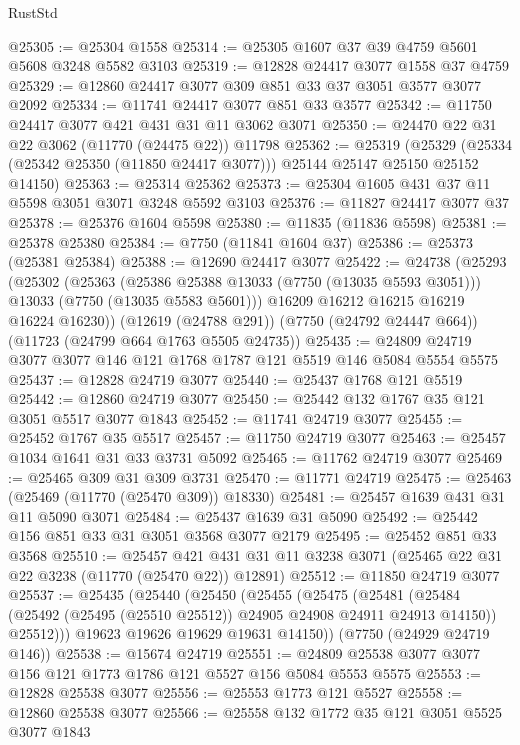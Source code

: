 \begin{lexlean}{RustStd}
\begin{coremodule}
@25305 := @25304 @1558
@25314 := @25305 @1607 @37 @39 @4759 @5601 @5608 @3248 @5582 @3103
@25319 := @12828 @24417 @3077 @1558 @37 @4759
@25329 := @12860 @24417 @3077 @309 @851 @33 @37 @3051 @3577 @3077 @2092
@25334 := @11741 @24417 @3077 @851 @33 @3577
@25342 := @11750 @24417 @3077 @421 @431 @31 @11 @3062 @3071
@25350 := @24470 @22 @31 @22 @3062 (@11770 (@24475 @22)) @11798
@25362 := @25319
    (@25329 (@25334 (@25342 @25350 (@11850 @24417 @3077))) @25144 @25147 @25150 @25152 @14150)
@25363 := @25314 @25362
@25373 := @25304 @1605 @431 @37 @11 @5598 @3051 @3071 @3248 @5592 @3103
@25376 := @11827 @24417 @3077 @37
@25378 := @25376 @1604 @5598
@25380 := @11835 (@11836 @5598)
@25381 := @25378 @25380
@25384 := @7750 (@11841 @1604 @37)
@25386 := @25373 (@25381 @25384)
@25388 := @12690 @24417 @3077
@25422 := @24738
    (@25293
      (@25302
        (@25363
          (@25386 @25388 @13033 (@7750 (@13035 @5593 @3051)))
          @13033
          (@7750 (@13035 @5583 @5601)))
        @16209
        @16212
        @16215
        @16219
        @16224
        @16230))
    (@12619 (@24788 @291))
    (@7750 (@24792 @24447 @664))
    (@11723 (@24799 @664 @1763 @5505 @24735))
@25435 := @24809 @24719 @3077 @3077 @146 @121 @1768 @1787 @121 @5519 @146 @5084 @5554 @5575
@25437 := @12828 @24719 @3077
@25440 := @25437 @1768 @121 @5519
@25442 := @12860 @24719 @3077
@25450 := @25442 @132 @1767 @35 @121 @3051 @5517 @3077 @1843
@25452 := @11741 @24719 @3077
@25455 := @25452 @1767 @35 @5517
@25457 := @11750 @24719 @3077
@25463 := @25457 @1034 @1641 @31 @33 @3731 @5092
@25465 := @11762 @24719 @3077
@25469 := @25465 @309 @31 @309 @3731
@25470 := @11771 @24719
@25475 := @25463 (@25469 (@11770 (@25470 @309)) @18330)
@25481 := @25457 @1639 @431 @31 @11 @5090 @3071
@25484 := @25437 @1639 @31 @5090
@25492 := @25442 @156 @851 @33 @31 @3051 @3568 @3077 @2179
@25495 := @25452 @851 @33 @3568
@25510 := @25457
    @421
    @431
    @31
    @11
    @3238
    @3071
    (@25465 @22 @31 @22 @3238 (@11770 (@25470 @22)) @12891)
@25512 := @11850 @24719 @3077
@25537 := @25435
    (@25440
      (@25450
        (@25455
          (@25475
            (@25481
              (@25484 (@25492 (@25495 (@25510 @25512)) @24905 @24908 @24911 @24913 @14150))
              @25512)))
        @19623
        @19626
        @19629
        @19631
        @14150))
    (@7750 (@24929 @24719 @146))
@25538 := @15674 @24719
@25551 := @24809 @25538 @3077 @3077 @156 @121 @1773 @1786 @121 @5527 @156 @5084 @5553 @5575
@25553 := @12828 @25538 @3077
@25556 := @25553 @1773 @121 @5527
@25558 := @12860 @25538 @3077
@25566 := @25558 @132 @1772 @35 @121 @3051 @5525 @3077 @1843

\end{coremodule}
\end{lexlean}
